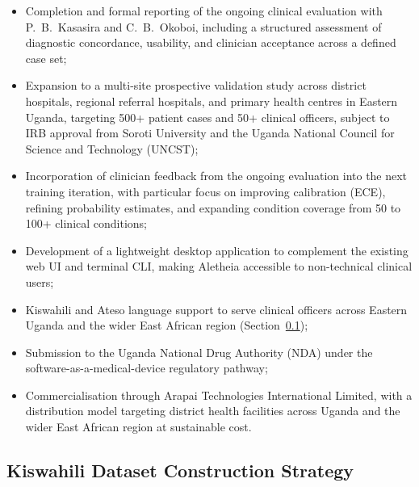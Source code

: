 \documentclass[journal]{IEEEtran}
\begin{document}
\begin{itemize}
  \item Completion and formal reporting of the ongoing clinical
        evaluation with P.~B.~Kasasira and C.~B.~Okoboi, including
        a structured assessment of diagnostic concordance, usability,
        and clinician acceptance across a defined case set;

  \item Expansion to a multi-site prospective validation study
        across district hospitals, regional referral hospitals, and
        primary health centres in Eastern Uganda, targeting 500+
        patient cases and 50+ clinical officers, subject to IRB
        approval from Soroti University and the Uganda National
        Council for Science and Technology (UNCST);

  \item Incorporation of clinician feedback from the ongoing
        evaluation into the next training iteration, with particular
        focus on improving calibration (ECE), refining probability
        estimates, and expanding condition coverage from 50 to
        100+ clinical conditions;

  \item Development of a lightweight desktop application to
        complement the existing web UI and terminal CLI,
        making Aletheia accessible to non-technical clinical users;

  \item Kiswahili and Ateso language support to serve clinical
        officers across Eastern Uganda and the wider East African
        region (Section~\ref{sec:kiswahili_dataset});

  \item Submission to the Uganda National Drug Authority (NDA)
        under the software-as-a-medical-device regulatory pathway;

  \item Commercialisation through Arapai Technologies International Limited, with a distribution model targeting district
        health facilities across Uganda and the wider East African
        region at sustainable cost.
\end{itemize}

\subsection{Kiswahili Dataset Construction Strategy}
\label{sec:kiswahili_dataset}
\end{document}

